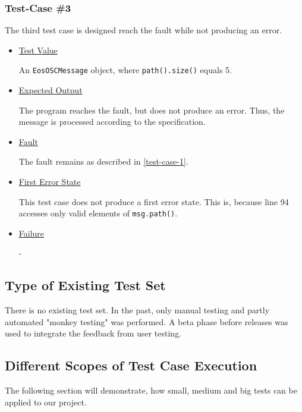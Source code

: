 \documentclass{scrreprt}
\begin{document}
\subsubsection{Test-Case \#3}
\label{test-case-3}

The third test case is designed reach the fault while not producing an error.

\begin{itemize}
	\item[] \underline{Test Value}
	
	An \texttt{EosOSCMessage} object, where \texttt{path().size()} equals 5.
	
	\item[] \underline{Expected Output}
	
	The program reaches the fault, but does not produce an error. Thus, the message is processed according to the specification.
	
	\item[] \underline{Fault}
	
	The fault remains as described in \vref{test-case-1}. 
	
	\item[] \underline{First Error State}
	
	This test case does not produce a first error state. This is, because line 94 accesses only valid elements of \texttt{msg.path()}.
	
	\item[] \underline{Failure}
	
	-
\end{itemize}

\subsection{Type of Existing Test Set}

There is no existing test set. In the past, only manual testing and partly automated "monkey testing" was performed. A beta phase before releases was used to integrate the feedback from user testing.

\subsection{Different Scopes of Test Case Execution}

The following section will demonstrate, how small, medium and big tests can be applied to our project.
\end{document}
